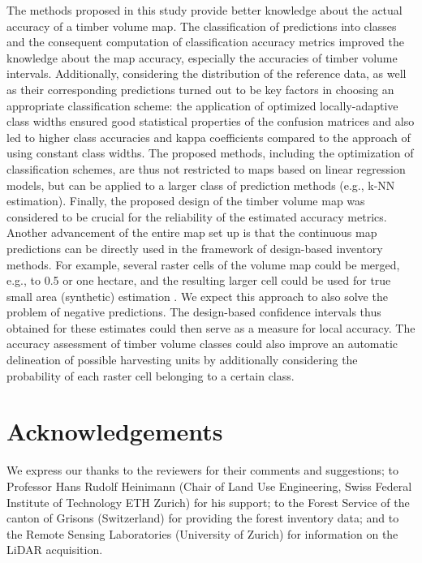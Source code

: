 The methods proposed in this study provide better knowledge about the actual accuracy of a timber volume map. The classification of predictions into classes and the consequent computation of classification accuracy metrics improved the knowledge about the map accuracy, especially the accuracies of timber volume intervals. Additionally, considering the distribution of the reference data, as well as their corresponding predictions turned out to be key factors in choosing an appropriate classification scheme: the application of optimized locally-adaptive class widths ensured good statistical properties of the confusion matrices and also led to higher class accuracies and kappa coefficients compared to the approach of using constant class widths. The proposed methods, including the optimization of classification schemes, are thus not restricted to maps based on linear regression models, but can be applied to a larger class of prediction methods (e.g., k-NN estimation). Finally, the proposed design of the timber volume map was considered to be crucial for the reliability of the estimated accuracy metrics. Another advancement of the entire map set up is that the continuous map predictions can be directly used in the framework of design-based inventory methods. For example, several raster cells of the volume map could be merged, e.g., to 0.5 or one hectare, and the resulting larger cell could be used for true small area (synthetic) estimation \citep{mandallaz2013a}. We expect this approach to also solve the problem of negative predictions. The design-based confidence intervals thus obtained for these estimates could then serve as a measure for local accuracy. The accuracy assessment of timber volume classes could also improve an automatic delineation of possible harvesting units by additionally considering the probability of each raster cell belonging to a certain class.


\section*{Acknowledgements}
\thispagestyle{plain}

We express our thanks to the reviewers for their comments and suggestions; to Professor Hans Rudolf Heinimann (Chair of Land Use Engineering, Swiss Federal Institute of Technology ETH Zurich) for his support; to the Forest Service of the canton of Grisons (Switzerland) for providing the forest inventory data; and to the Remote Sensing Laboratories (University of Zurich) for information on the LiDAR acquisition.

